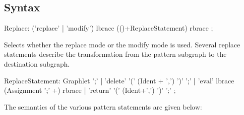 \subsection{Syntax}

\begin{rail}
  Replace: ('replace' | 'modify') lbrace (()+ReplaceStatement) rbrace ;
\end{rail}
Selects whether the replace mode or the modify mode is used. Several replace statements describe the transformation from the pattern subgraph to the destination subgraph.

\begin{rail}  
  ReplaceStatement: Graphlet ';' |
    'delete' '(' (Ident + ',') ')' ';' |
    'eval' lbrace (Assignment ';' +) rbrace |
    'return' '(' (Ident+',') ')' ';' ;
\end{rail}
The semantics of the various pattern statements are given below:
